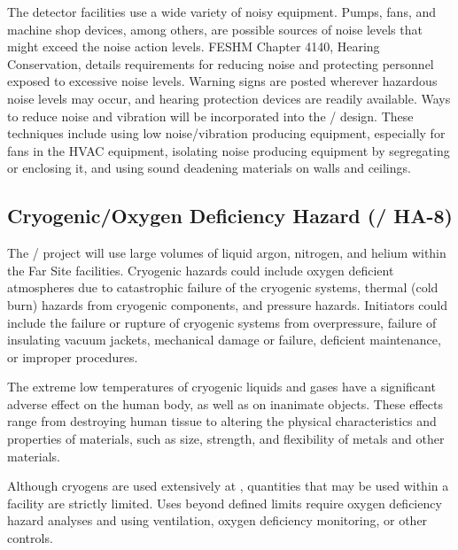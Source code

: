 The detector facilities use a wide variety of noisy equipment. Pumps,
fans, and machine shop devices, among others, are possible sources of
noise levels that might exceed the \fnal noise action levels. FESHM
Chapter 4140, Hearing Conservation, details requirements for reducing
noise and protecting personnel exposed to excessive noise
levels. Warning signs are posted wherever hazardous noise levels may
occur, and hearing protection devices are readily
available. Ways to reduce noise and vibration will be
incorporated into the / design. These techniques include using
low noise/vibration producing equipment, especially for fans in the
HVAC equipment, isolating noise producing equipment by segregating
or enclosing it, and using sound deadening materials on walls and
ceilings.

\subsection{Cryogenic/Oxygen Deficiency Hazard (/ HA-8)}

The / project will use large volumes of liquid argon, nitrogen,
and helium within the Far Site facilities. Cryogenic hazards could
include oxygen deficient atmospheres due to
catastrophic failure of the cryogenic systems, thermal (cold burn)
hazards from cryogenic components, and pressure hazards. Initiators
could include the failure or rupture of cryogenic systems from
overpressure, failure of insulating vacuum jackets, mechanical damage
or failure, deficient maintenance, or improper procedures.

The extreme low temperatures of cryogenic liquids and gases have a
significant adverse effect on the human body, as well as on inanimate
objects. These effects range from destroying human tissue to altering
the physical characteristics and properties of materials, such as
size, strength, and flexibility of metals and other materials. 

Although cryogens are used extensively at \fnal, quantities that may be used within a facility are strictly limited. Uses
beyond defined limits require oxygen deficiency hazard 
analyses and using ventilation, oxygen deficiency monitoring, or
other controls.

